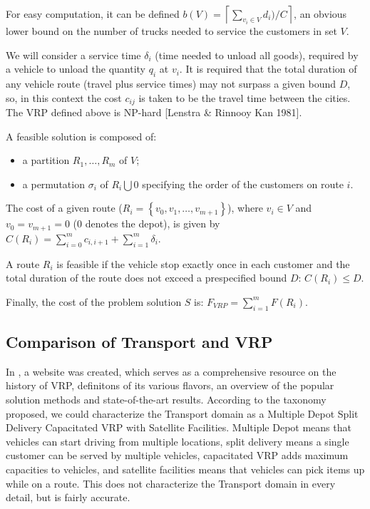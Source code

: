 {For easy computation, it can be defined ${b(V) = \left\lceil \sum_{v_{i} \in V} d_{i}) / C \right\rceil}$, an obvious lower bound on the number of trucks needed to service the customers in set ${V}$.

We will consider a service time $\delta_{i}$ (time needed to unload all goods), required by a vehicle to unload the quantity ${q_{i}}$ at ${v_{i}}$. It is required that the total duration of any vehicle route (travel plus service times) may not surpass a given bound ${D}$, so, in this context the cost ${c_{ij}}$ is taken to be the travel time between the cities. The VRP defined above is NP-hard [Lenstra \& Rinnooy Kan 1981].

A feasible solution is composed of:

\begin{itemize}
\item a partition ${R_{1}, \ldots, R_{m}}$ of ${V}$;
\item a permutation ${\sigma_{i}}$ of ${R_{i} \bigcup {0}}$ specifying the order of the customers on route ${i}$.
\end{itemize}


The cost of a given route (${R_{i} = \left\lbrace v_{0}, v_{1}, \ldots, v_{m+1} \right\rbrace}$), where ${v_{i} \in V}$ and ${v_{0} = v_{m+1} = 0}$ (0 denotes the depot), is given by ${C(R_{i}) = \sum_{i=0}^{m} c_{i,i+1} + \sum_{i=1}^{m} \delta_{i}}$.

A route ${R_{i}}$ is feasible if the vehicle stop exactly once in each customer and the total duration of the route does not exceed a prespecified bound ${D}$: ${C(R_{i}) \leq D}$.

Finally, the cost of the problem solution ${S}$ is: ${F_{VRP} = \sum_{i=1}^{m} F(R_{i})}$.
}

\subsection{Comparison of Transport and VRP}

In \citet{ResearchGroup2013}, a website was created, which serves as a comprehensive resource on the history of VRP,
definitons of its various flavors, an overview of the popular solution methods and state-of-the-art results. According to the taxonomy proposed, we could characterize the Transport domain
as a Multiple Depot Split Delivery Capacitated VRP with Satellite Facilities. Multiple Depot
means that vehicles can start driving from multiple locations, split delivery
means a single customer can be served by multiple vehicles, capacitated VRP adds maximum
capacities to vehicles, and satellite facilities means that vehicles can pick items up
while on a route. This does not characterize the Transport domain in every detail,
but is fairly accurate.

